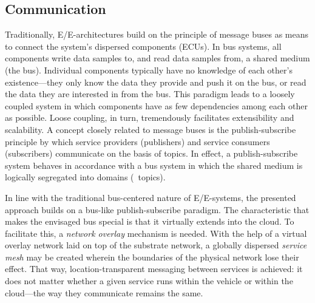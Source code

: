 \subsection{Communication}
Traditionally, E/E-architectures build on the principle of message buses as means to connect the system's dispersed components (ECUs). In bus systems, all components write data samples to, and read data samples from, a shared medium (the bus). Individual components typically have no knowledge of each other's existence---they only know the data they provide and push it on the bus, or read the data they are interested in from the bus. This paradigm leads to a loosely coupled system in which components have as few dependencies among each other as possible. Loose coupling, in turn, tremendously facilitates extensibility and scalability. A concept closely related to message buses is the publish-subscribe principle by which service providers (publishers) and service consumers (subscribers) communicate on the basis of topics. In effect, a publish-subscribe system behaves in accordance with a bus system in which the shared medium is logically segregated into domains (\ie\ topics). 

In line with the traditional bus-centered nature of E/E-systems, the presented approach builds on a bus-like publish-subscribe paradigm. The characteristic that makes the envisaged bus special is that it virtually extends into the cloud. To facilitate this, a \emph{network overlay} \cite{tarkoma2010overlay} mechanism is needed. With the help of a virtual overlay network laid on top of the substrate network, a globally dispersed \emph{service mesh} may be created wherein the boundaries of the physical network lose their effect. That way, location-transparent messaging between services is achieved: it does not matter whether a given service runs within the vehicle or within the cloud---the way they communicate remains the same.




